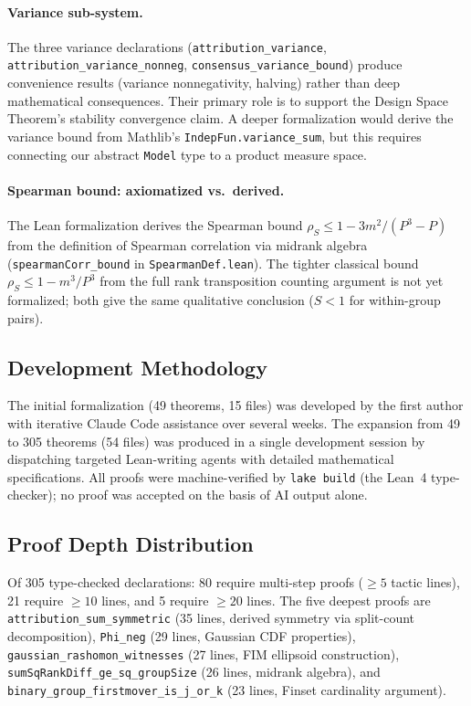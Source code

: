 \documentclass{article}
\begin{document}
\paragraph{Variance sub-system.}
\begin{sloppypar}
The three variance declarations (\texttt{attribution\allowbreak\_variance},
\texttt{attribution\allowbreak\_variance\allowbreak\_nonneg},
\texttt{consensus\allowbreak\_variance\allowbreak\_bound}) produce convenience results
(variance nonnegativity, halving) rather than deep mathematical consequences. Their
primary role is to support the Design Space Theorem's stability convergence claim.
A deeper formalization would derive the variance bound from Mathlib's
\texttt{IndepFun.variance\_sum}, but this requires connecting our abstract
\texttt{Model} type to a product measure space.
\end{sloppypar}

\paragraph{Spearman bound: axiomatized vs.\ derived.}
The Lean formalization derives the Spearman bound $\rho_S \leq 1 - 3m^2/(P^3{-}P)$ from the definition of Spearman correlation via midrank algebra (\texttt{spearmanCorr\_bound} in \texttt{SpearmanDef.lean}). The tighter classical bound $\rho_S \leq 1 - m^3/P^3$ from the full rank transposition counting argument is not yet formalized; both give the same qualitative conclusion ($S < 1$ for within-group pairs).

\subsection{Development Methodology}

The initial formalization (49 theorems, 15 files) was developed by the first author with iterative Claude Code assistance over several weeks. The expansion from 49 to 305 theorems (54 files) was produced in a single development session by dispatching targeted Lean-writing agents with detailed mathematical specifications. All proofs were machine-verified by \texttt{lake build} (the Lean~4 type-checker); no proof was accepted on the basis of AI output alone.

\subsection{Proof Depth Distribution}

Of 305 type-checked declarations: 80 require multi-step proofs (${\geq}5$ tactic lines), 21 require ${\geq}10$ lines, and 5 require ${\geq}20$ lines. The five deepest proofs are \texttt{attribution\_sum\_symmetric} (35 lines, derived symmetry via split-count decomposition), \texttt{Phi\_neg} (29 lines, Gaussian CDF properties), \texttt{gaussian\_rashomon\_witnesses} (27 lines, FIM ellipsoid construction), \texttt{sumSqRankDiff\_ge\_sq\_groupSize} (26 lines, midrank algebra), and \texttt{binary\_group\_firstmover\_is\_j\_or\_k} (23 lines, Finset cardinality argument).
\end{document}
